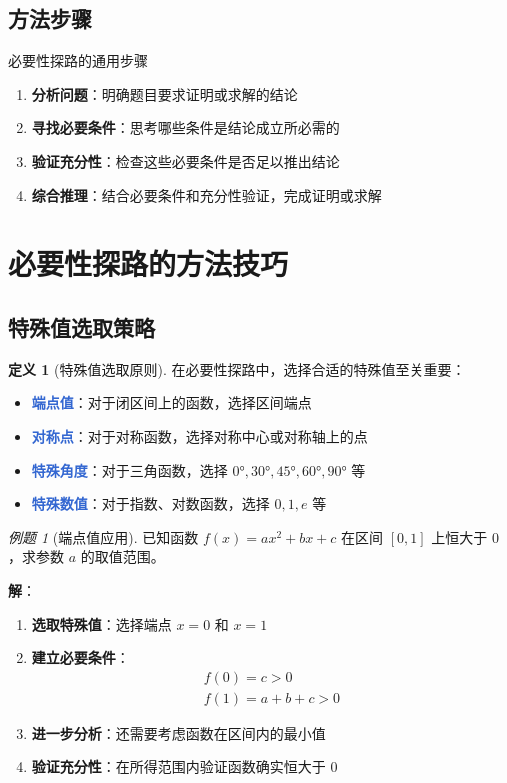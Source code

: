 \documentclass[a4paper,11pt]{ctexart}
\newcommand{\highlight}[1]{\textcolor{highlight}{\textbf{#1}}}
\newcommand{\keypoint}[1]{\textcolor{secondary}{\textbf{#1}}}
\theoremstyle{definition}
\newtheorem{definition}{定义}[section]
\theoremstyle{remark}
\newtheorem{example}{例题}[section]
\begin{document}
\subsection{方法步骤}

\begin{summarybox}{必要性探路的通用步骤}
\begin{enumerate}
    \item \textbf{分析问题}：明确题目要求证明或求解的结论
    \item \textbf{寻找必要条件}：思考哪些条件是结论成立所必需的
    \item \textbf{验证充分性}：检查这些必要条件是否足以推出结论
    \item \textbf{综合推理}：结合必要条件和充分性验证，完成证明或求解
\end{enumerate}
\end{summarybox}

\newpage

\section{必要性探路的方法技巧}

\subsection{特殊值选取策略}

\begin{definition}[特殊值选取原则]
在必要性探路中，选择合适的特殊值至关重要：
\begin{itemize}
    \item \highlight{端点值}：对于闭区间上的函数，选择区间端点
    \item \highlight{对称点}：对于对称函数，选择对称中心或对称轴上的点
    \item \highlight{特殊角度}：对于三角函数，选择 $0°, 30°, 45°, 60°, 90°$ 等
    \item \highlight{特殊数值}：对于指数、对数函数，选择 $0, 1, e$ 等
\end{itemize}
\end{definition}

\begin{example}[端点值应用]
已知函数 $f(x) = ax^2 + bx + c$ 在区间 $[0, 1]$ 上恒大于 $0$，求参数 $a$ 的取值范围。

\textbf{解}：
\begin{enumerate}

    \item \keypoint{选取特殊值}：选择端点 $x = 0$ 和 $x = 1$
    \item \keypoint{建立必要条件}：
    \begin{align}
    f(0) = c > 0 \\
    f(1) = a + b + c > 0
    \end{align}
    \item \keypoint{进一步分析}：还需要考虑函数在区间内的最小值
    \item \keypoint{验证充分性}：在所得范围内验证函数确实恒大于 $0$
\end{enumerate}
\end{example}
\end{document}
